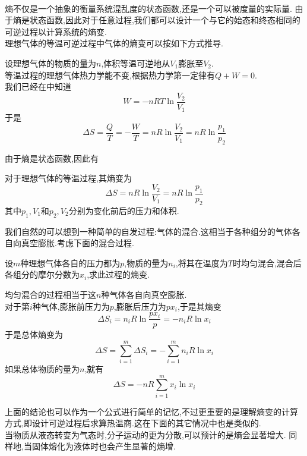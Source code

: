 \documentclass{ctexart}
\begin{document}
\pagestyle{plain}
\noindent{}\vspace{15pt}\\
\indent 熵不仅是一个抽象的衡量系统混乱度的状态函数,还是一个可以被度量的实际量.%
由于熵是状态函数,因此对于任意过程,我们都可以设计一个与它的始态和终态相同的可逆过程以计算系统的熵变.\vspace{12pt}\\
\indent 理想气体的等温可逆过程中气体的熵变可以按如下方式推导.
\begin{derivation}
    设理想气体的物质的量为$n$,体积等温可逆地从$V_1$膨胀至$V_2$.\\
    等温过程的理想气体热力学能不变,根据热力学第一定律有$Q+W=0$.\\
    我们已经在中知道
    \[W=-nRT\ln\dfrac{V_2}{V_1}\]
    于是
    \[\Delta S=\dfrac{Q}{T}=-\dfrac{W}{T}=nR\ln\dfrac{V_2}{V_1}=nR\ln\dfrac{p_1}{p_2}\]

\end{derivation}
由于熵是状态函数,因此有
\begin{theorem}[3C.1.1 理想气体等温过程的熵变]
    对于理想气体的等温过程,其熵变为
    \[\Delta S=nR\ln\dfrac{V_2}{V_1}=nR\ln\dfrac{p_1}{p_2}\]
    其中$p_1,V_1$和$p_2,V_2$分别为变化前后的压力和体积.
\end{theorem}
我们自然的可以想到一种简单的自发过程:气体的混合.这相当于各种组分的气体各自向真空膨胀.考虑下面的混合过程.
\begin{problem}[3C.1.2]
    设$m$种理想气体各自的压力都为$p$,物质的量为$n_i$,将其在温度为$T$时均匀混合,混合后各组分的摩尔分数为$x_i$,求此过程的熵变.
\end{problem}
\begin{solution}
    均匀混合的过程相当于这$n$种气体各自向真空膨胀.\\
    对于第$i$种气体,膨胀前压力为$p$,膨胀后压力为$px_i$,于是其熵变
    \[\Delta S_i=n_iR\ln\dfrac{px_i}{p}=-n_iR\ln x_i\]
    于是总体熵变为
    \[\Delta S=\sum_{i=1}^m\Delta S_i=-\sum_{i=1}^mn_iR\ln x_i\]
    如果总体物质的量为$n$,就有
    \[\Delta S=-nR\sum_{i=1}^mx_i\ln x_i\]

\end{solution}
上面的结论也可以作为一个公式进行简单的记忆,不过更重要的是理解熵变的计算方式,即设计可逆过程后求算热温商.这在下面的其它情况中也是类似的.\vspace{12pt}\\
\indent 当物质从液态转变为气态时,分子运动的更为分散,可以预计的是熵会显著增大.%
同样地,当固体熔化为液体时也会产生显著的熵增.\\
\end{document}

